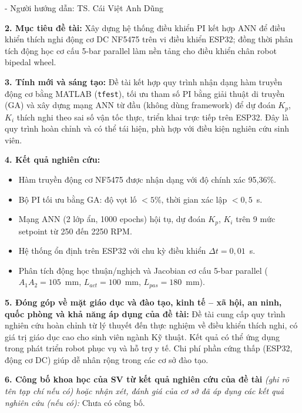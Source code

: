 {\vspace{0.15cm}
\noindent- Người hướng dẫn: TS. Cái Việt Anh Dũng

\vspace{0.2cm}
\noindent\textbf{2. Mục tiêu đề tài:} Xây dựng hệ thống điều khiển PI kết hợp ANN để điều
khiển thích nghi động cơ DC NF5475 trên vi điều khiển ESP32; đồng thời phân tích động học
cơ cấu 5-bar parallel làm nền tảng cho điều khiển chân robot bipedal wheel.

\vspace{0.2cm}
\noindent\textbf{3. Tính mới và sáng tạo:} Đề tài kết hợp quy trình nhận dạng hàm truyền
động cơ bằng MATLAB (\texttt{tfest}), tối ưu tham số PI bằng giải thuật di truyền (GA) và
xây dựng mạng ANN từ đầu (không dùng framework) để dự đoán $K_p$, $K_i$ thích nghi theo
sai số vận tốc thực, triển khai trực tiếp trên ESP32. Đây là quy trình hoàn chỉnh và có
thể tái hiện, phù hợp với điều kiện nghiên cứu sinh viên.

\vspace{0.2cm}
\noindent\textbf{4. Kết quả nghiên cứu:}
\begin{itemize}[leftmargin=0.5cm, topsep=2pt, itemsep=0pt]
    \item Hàm truyền động cơ NF5475 được nhận dạng với độ chính xác 95,36\%.
    \item Bộ PI tối ưu bằng GA: độ vọt lố $<5\%$, thời gian xác lập $<0{,}5$~s.
    \item Mạng ANN (2 lớp ẩn, 1000 epochs) hội tụ, dự đoán $K_p$, $K_i$ trên 9 mức
    setpoint từ 250 đến 2250 RPM.
    \item Hệ thống ổn định trên ESP32 với chu kỳ điều khiển $\Delta t = 0{,}01$~s.
    \item Phân tích động học thuận/nghịch và Jacobian cơ cấu 5-bar parallel
    ($A_1A_2 = 105$~mm, $L_{act} = 100$~mm, $L_{pas} = 180$~mm).
\end{itemize}

\vspace{0.15cm}
\noindent\textbf{5. Đóng góp về mặt giáo dục và đào tạo, kinh tế -- xã hội, an ninh, quốc
phòng và khả năng áp dụng của đề tài:} Đề tài cung cấp quy trình nghiên cứu hoàn chỉnh từ
lý thuyết đến thực nghiệm về điều khiển thích nghi, có giá trị giáo dục cao cho sinh viên
ngành Kỹ thuật. Kết quả có thể ứng dụng trong phát triển robot phục vụ và hỗ trợ y tế. Chi
phí phần cứng thấp (ESP32, động cơ DC) giúp dễ nhân rộng trong các cơ sở đào tạo.

\vspace{0.15cm}
\noindent\textbf{6. Công bố khoa học của SV từ kết quả nghiên cứu của đề tài}
\textit{(ghi rõ tên tạp chí nếu có) hoặc nhận xét, đánh giá của cơ sở đã áp dụng các kết
quả nghiên cứu (nếu có):} Chưa có công bố.

}
